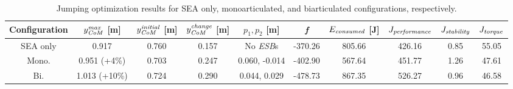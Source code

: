 \documentclass[letterpaper, 10 pt, conference]{ieeeconf}  %
\begin{document}
\begin{table}[ht]
	\caption{Jumping optimization results for SEA only, monoarticulated, and biarticulated configurations, respectively.}
	\label{table:maxheight}
	\begin{center}
		\begin{tabular}[t]{c|c|c|c|c|c|c|c|c|c}
			Configuration &  $y_{\text{\textit{CoM}}}^{\text{\textit{max}}}$ [m] & $y_{\text{\textit{CoM}}}^{\text{\textit{initial}}}$ [m]& $y_{\text{\textit{CoM}}}^{\text{\textit{change}}}$ [m]& $p_1,p_2$ [m] & \textit{f} & $E_{\text{\textit{consumed}}}$ [J] & $J_{\text{\textit{performance}}}$ & $J_{\text{\textit{stability}}}$ & $J_{\text{\textit{torque}}}$ \\ 
			\hline
			SEA only	& 0.917 & 0.760 & 0.157 & No \textit{ESB}s	& -370.26 & 805.66 & 426.16 & 0.85 & 55.05\\
			\hline
			Mono.		& 0.951 (+4\%) & 0.703 & 0.247 & 0.060, -0.014	& -402.90 & 567.64 & 451.77 & 1.26 & 47.61 \\
			\hline
			Bi.			& 1.013 (+10\%) & 0.724 & 0.290 & 0.044, 0.029		& -478.73 & 867.35 & 526.27 & 0.96 & 46.58
		\end{tabular}
	\end{center}
\end{table}
\end{document}

